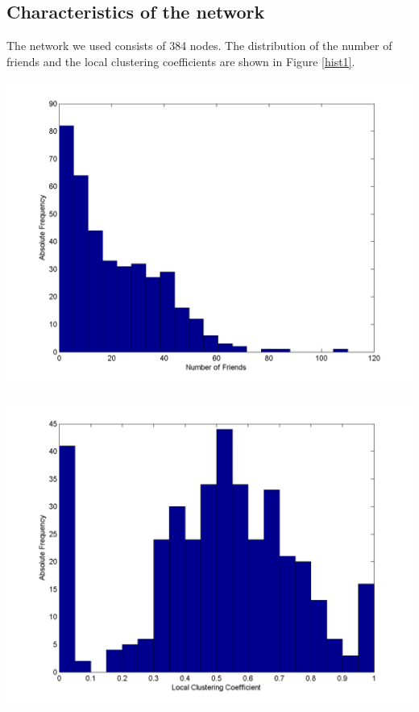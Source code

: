 \subsection{Characteristics of the network}

The network we used consists of 384 nodes. The distribution of the number of friends and the local clustering coefficients are shown in Figure \ref{hist1}.


\begin{minipage}{0.5\textwidth}
\includegraphics[scale=0.4]{network_degreehist.png}
\end{minipage}
\begin{minipage}{0.5\textwidth}
\includegraphics[scale=0.4]{network_clusterhist.png}
\end{minipage}
\label{hist1}


